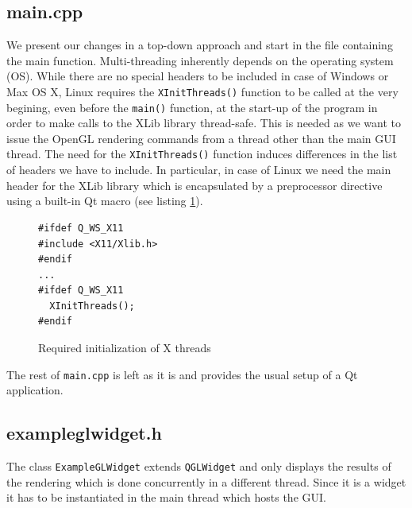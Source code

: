 \documentclass[jou,noapacite]{apa}
\begin{document}
\subsection{main.cpp}

We present our changes in a top-down approach and start in the file containing
the main function.
%
Multi-threading inherently depends on the operating system (OS).
%
While there are no special headers to be included in case of {\sf Windows} or
{\sf Max OS X}, {\sf Linux} requires the \lstinline|XInitThreads()| function to
be called at the very begining, even before the \lstinline|main()| function, at
the start-up of the program in order to make calls to the  {\sf XLib} library
thread-safe.
%
This is needed as we want to issue the OpenGL rendering commands from a thread
other than the main GUI thread.
%
The need for the \lstinline|XInitThreads()| function induces differences in the
list of headers we have to include.
%
In particular, in case of Linux we need the main header for the {\sf XLib}
library which is encapsulated by a preprocessor directive using a built-in Qt
macro (see listing \ref{lst:initthreads}).
%
\begin{figure}[h]
\begin{lstlisting}[basicstyle=\scriptsize]
#ifdef Q_WS_X11
#include <X11/Xlib.h>
#endif
...
#ifdef Q_WS_X11
  XInitThreads();
#endif
\end{lstlisting}
\caption{Required initialization of X threads}
\label{lst:initthreads}
\end{figure}

The rest of \lstinline|main.cpp| is left as it is and provides the usual setup
of a Qt application.


\subsection{exampleglwidget.h}

The class \lstinline|ExampleGLWidget| extends \lstinline|QGLWidget| and only
displays the results of the rendering which is done concurrently in a different
thread.
%
Since it is a widget it has to be instantiated in the main thread which hosts
the GUI.
\end{document}
